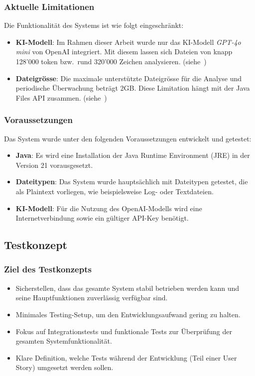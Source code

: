 \documentclass[a4paper,12pt]{report}
\begin{document}
    \subsubsection{Aktuelle Limitationen}
    Die Funktionalität des Systems ist wie folgt eingeschränkt:
    \begin{itemize}
        \item \textbf{KI-Modell}: Im Rahmen dieser Arbeit wurde nur das KI-Modell \textit{GPT-4o mini} von OpenAI integriert.
        Mit diesem lassen sich Dateien von knapp 128'000 \gls{token} bzw.\ rund 320'000 Zeichen analysieren.
        (siehe~)
        \item \textbf{Dateigrösse}: Die maximale unterstützte Dateigrösse für die Analyse und periodische Überwachung beträgt 2GB\@.
        Diese Limitation hängt mit der Java Files API zusammen.
        (siehe~)
    \end{itemize}

    \subsubsection{Voraussetzungen}
    Das System wurde unter den folgenden Voraussetzungen entwickelt und getestet:
    \begin{itemize}
        \item \textbf{Java}: Es wird eine Installation der Java Runtime Environment (JRE) in der Version 21 vorausgesetzt.
        \item \textbf{Dateitypen}: Das System wurde hauptsächlich mit Dateitypen getestet, die als Plaintext vorliegen, wie beispielsweise Log- oder Textdateien.
        \item \textbf{KI-Modell}: Für die Nutzung des OpenAI-Modells wird eine Internetverbindung sowie ein gültiger API-Key benötigt.
    \end{itemize}

    \clearpage

    \subsection{Testkonzept}

    \subsubsection{Ziel des Testkonzepts}
    \begin{itemize}
        \item Sicherstellen, dass das gesamte System stabil betrieben werden kann und seine Hauptfunktionen zuverlässig verfügbar sind.
        \item Minimales Testing-Setup, um den Entwicklungsaufwand gering zu halten.
        \item Fokus auf Integrationstests und funktionale Tests zur Überprüfung der gesamten Systemfunktionalität.
        \item Klare Definition, welche Tests während der Entwicklung (Teil einer User Story) umgesetzt werden sollen.
    \end{itemize}
\end{document}
